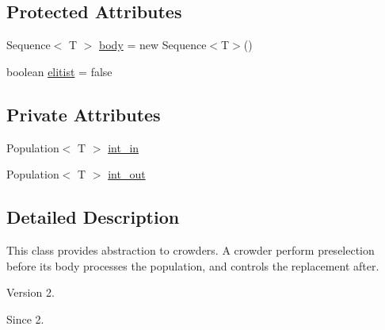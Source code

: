 \subsection*{Protected Attributes}
\begin{DoxyCompactItemize}
\item 
Sequence$<$ T $>$ \hyperlink{classjenes_1_1stage_1_1operator_1_1_crowder_3_01_t_01extends_01_chromosome_01_4_a81522e76967039395a3567c866fa59ed}{body} = new Sequence$<$T$>$()
\item 
boolean \hyperlink{classjenes_1_1stage_1_1operator_1_1_crowder_3_01_t_01extends_01_chromosome_01_4_a5337bdf3f7d5ad8d6e09daaa3bb0636b}{elitist} = false
\end{DoxyCompactItemize}
\subsection*{Private Attributes}
\begin{DoxyCompactItemize}
\item 
Population$<$ T $>$ \hyperlink{classjenes_1_1stage_1_1operator_1_1_crowder_3_01_t_01extends_01_chromosome_01_4_a59e2223bf2006485e7c617201f0bba3e}{int\-\_\-in}
\item 
Population$<$ T $>$ \hyperlink{classjenes_1_1stage_1_1operator_1_1_crowder_3_01_t_01extends_01_chromosome_01_4_ab31ce2f75fb5516e18c73a56d31c2c57}{int\-\_\-out}
\end{DoxyCompactItemize}


\subsection{Detailed Description}
This class provides abstraction to crowders. A crowder perform preselection before its body processes the population, and controls the replacement after.

\begin{DoxyVersion}{Version}
2. 
\end{DoxyVersion}
\begin{DoxySince}{Since}
2. 
\end{DoxySince}


